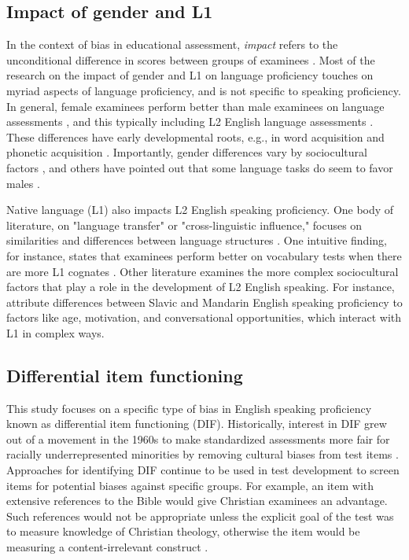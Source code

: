 \documentclass [PhD] {uclathes}
\begin{document}
\subsection{Impact of gender and L1}

In the context of bias in educational assessment, \emph{impact} refers to the unconditional difference in scores between groups of examinees \citep{angoff1993}. Most of the research on the impact of gender and L1 on language proficiency touches on myriad aspects of language proficiency, and is not specific to speaking proficiency. In general, female examinees perform better than male examinees on language assessments \citep{reilly2019gender}, and this typically including L2 English language assessments \citep{denies2022mapping}. These differences have early developmental roots, e.g., in word acquisition \citep{kaushanskaya2013gender} and phonetic acquisition \citep{dodd2003phonological}. Importantly, gender differences vary by sociocultural factors \citep{denies2022mapping}, and others have pointed out that some language tasks do seem to favor males \citep{wucherer2018language}. 

Native language (L1) also impacts L2 English speaking proficiency. One body of literature, on "language transfer" or "cross-linguistic influence," focuses on similarities and differences between language structures \citep[][p. 257]{brown2000principles}. One intuitive finding, for instance, states that examinees perform better on vocabulary tests when there are more L1 cognates \citep{lesniewska2018first}. Other literature examines the more complex sociocultural factors that play a role in the development of L2 English speaking. For instance, \citet{derwing2013development} attribute differences between Slavic and Mandarin English speaking proficiency to factors like age, motivation, and conversational opportunities, which interact with L1 in complex ways. 

\subsection{Differential item functioning}
\label{intro_dif}

This study focuses on a specific type of bias in English speaking proficiency known as differential item functioning (DIF). Historically, interest in DIF grew out of a movement in the 1960s to make standardized assessments more fair for racially underrepresented minorities by removing cultural biases from test items \citep{angoff1993}. Approaches for identifying DIF continue to be used in test development to screen items for potential biases against specific groups. For example, an item with extensive references to the Bible would give Christian examinees an advantage. Such references would not be appropriate unless the explicit goal of the test was to measure knowledge of Christian theology, otherwise the item would be measuring a content-irrelevant construct \citep{aera2014}.
\end{document}
